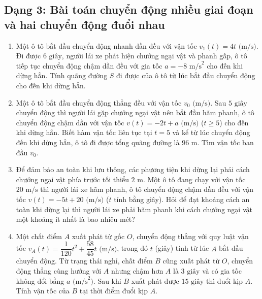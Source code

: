 \documentclass[12pt]{article}
\begin{document}
	\subsection{Dạng 3: Bài toán chuyển động nhiều giai đoạn và hai chuyển động đuổi nhau}
	\begin{btxanh}
		\begin{enumerate}[label=\textbf{Bài \arabic*.}]
			\item Một ô tô bắt đầu chuyển động nhanh dần đều với vận tốc $v_1(t) = 4t\text{ (m/s)}$. Đi được $6\text{ giây}$, người lái xe phát hiện chướng ngại vật và phanh gấp, ô tô tiếp tục chuyển động chậm dần đều với gia tốc $a = -8\text{ m/s}^2$ cho đến khi dừng hẳn. Tính quãng đường $S$ đi được của ô tô từ lúc bắt đầu chuyển động cho đến khi dừng hẳn.
			\item Một ô tô bắt đầu chuyển động thẳng đều với vận tốc $v_0\text{ (m/s)}$. Sau $5\text{ giây}$ chuyển động thì người lái gặp chướng ngại vật nên bắt đầu hãm phanh, ô tô chuyển động chậm dần với vận tốc $v(t) = -2t + a\text{ (m/s)}$ ($t \ge 5$) cho đến khi dừng hẳn. Biết hàm vận tốc liên tục tại $t = 5$ và kể từ lúc chuyển động đến khi dừng hẳn, ô tô đi được tổng quãng đường là $96\text{ m}$. Tìm vận tốc ban đầu $v_0$.
			\item Để đảm bảo an toàn khi lưu thông, các phương tiện khi dừng lại phải cách chướng ngại vật phía trước tối thiểu $2\text{ m}$. Một ô tô đang chạy với vận tốc $20\text{ m/s}$ thì người lái xe hãm phanh, ô tô chuyển động chậm dần đều với vận tốc $v(t) = -5t + 20\text{ (m/s)}$ ($t$ tính bằng giây). Hỏi để đạt khoảng cách an toàn khi dừng lại thì người lái xe phải hãm phanh khi cách chướng ngại vật một khoảng ít nhất là bao nhiêu mét?
			\item Một chất điểm $A$ xuất phát từ gốc $O$, chuyển động thẳng với quy luật vận tốc $v_A(t) = \dfrac{1}{120}t^2 + \dfrac{58}{45}t\text{ (m/s)}$, trong đó $t$ (giây) tính từ lúc $A$ bắt đầu chuyển động. Từ trạng thái nghỉ, chất điểm $B$ cũng xuất phát từ $O$, chuyển động thẳng cùng hướng với $A$ nhưng chậm hơn $A$ là $3\text{ giây}$ và có gia tốc không đổi bằng $a\text{ (m/s}^2\text{)}$. Sau khi $B$ xuất phát được $15\text{ giây}$ thì đuổi kịp $A$. Tính vận tốc của $B$ tại thời điểm đuổi kịp $A$.
		\end{enumerate}
	\end{btxanh}
	
\end{document}
